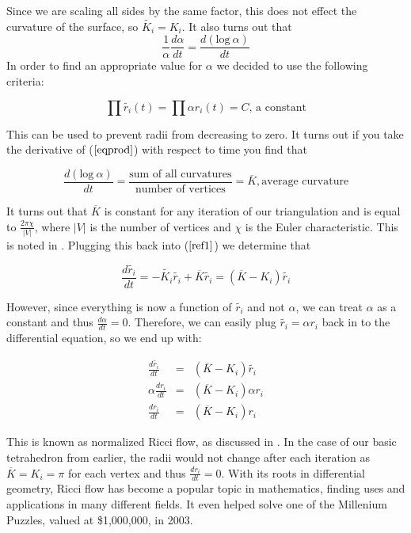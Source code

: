 \documentclass[12pt]{article}
\begin{document}
\noindent Since we are scaling all sides by the same factor, this does not effect the curvature of the surface, so $\tilde{K_i} = K_i$. It also turns out that $$\displaystyle \frac{1}{\alpha} \frac{d\alpha}{dt} = \frac{d(\mbox{log}~\alpha)}{dt}$$ 
 In order to find an appropriate value for $\alpha$ we decided to use the following criteria:
 
\begin{equation}
\label{eqprod}
\prod{\tilde{r_i}(t)} = \prod{\alpha r_i(t)} = C\mbox{, a constant}
\end{equation}

\noindent This can be used to prevent radii from decreasing to zero. It turns out if you take the derivative of ($\ref{eqprod}$) with respect to time you find that 
 
\begin{equation}
\label{proof1}
\frac{d(\mbox{log}~\alpha)}{dt} = \frac{\mbox{sum of all curvatures}}{\mbox{number of vertices}} = \overline{K}, \mbox{average curvature}
\end{equation}
 
\noindent It turns out that $\overline{K}$ is constant for any iteration of our triangulation and is equal to $\displaystyle\frac{2\pi\chi}{|V|}$, where $|V|$ is the number of vertices and $\chi$ is the Euler characteristic. This is noted in \cite{chowluo}. Plugging this back into ($\ref{ref1}$) we determine that

\begin{equation}
\frac{d\tilde{r_i}}{dt} = -\tilde{K_i}\tilde{r_i} + \overline{K}\tilde{r_i} = (\overline{K} - K_i)\tilde{r_i}
\end{equation}

\noindent However, since everything is now a function of $\tilde{r_i}$ and not $\alpha$, we can treat $\alpha$ as a constant and thus $\displaystyle\frac{d\alpha}{dt} = 0$. Therefore, we can easily plug $\tilde{r_i} = \alpha r_i$ back in to the differential equation, so we end up with:

\begin{eqnarray}
\label{Riccin}
\frac{d\tilde{r_i}}{dt} &=& (\overline{K} - K_i)\tilde{r_i} \nonumber \\
\alpha\frac{dr_i}{dt} &=& (\overline{K} - K_i)\alpha r_i \nonumber \\
\frac{dr_i}{dt} &=& (\overline{K} - K_i)r_i
\end{eqnarray}

\noindent This is known as normalized Ricci flow, as discussed in \cite{chowluo}. In the case of our basic tetrahedron from earlier, the radii would not change after each iteration as $\overline{K} = K_i = \pi$ for each vertex and thus $\displaystyle\frac{dr_i}{dt} = 0$. With its roots in differential geometry, Ricci flow has become a popular topic in mathematics, finding uses and applications in many different fields. It even helped solve one of the Millenium Puzzles, valued at \$1,000,000, in 2003. \cite{wikipoin}    
\end{document}
